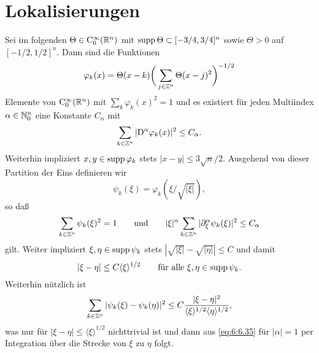 \section{Lokalisierungen}
Sei im folgenden $\Theta\in\mathrm C_0^\infty(\mathbb R^n)$ mit $\operatorname{supp}\Theta\subset [-3/4,3/4]^n$ sowie $\Theta>0$ auf $[-1/2,1/2]^n$. Dann sind die Funktionen
\begin{equation}
\varphi_k(x) = \Theta(x-k) \bigg(\sum_{j\in\mathbb Z^n} \Theta(x-j)^2\bigg)^{-1/2}
\end{equation}
Elemente von $\mathrm C_0^\infty(\mathbb R^n)$ mit $\sum_{k} \varphi_k(x)^2=1$ und es existiert für jeden Multiindex $\alpha\in\mathbb N_0^n$ eine Konstante $C_\alpha$ mit
\begin{equation}
    \sum_{k\in\mathbb Z^n} | \mathrm D^\alpha \varphi_k(x)|^2 \le C_\alpha.
\end{equation}
Weiterhin impliziert $x,y\in\operatorname{supp}\varphi_k$ stets $|x-y|\le 3\sqrt n/2$. Ausgehend von dieser Partition der Eins definieren wir
\begin{equation}
    \psi_k(\xi)= \varphi_k(\xi / \sqrt{|\xi|}), 
\end{equation}
so daß
\begin{equation}\label{eq:6:6.35} 
    \sum_{k\in\mathbb Z^n} \psi_k(\xi)^2 = 1\qquad\text{und}\qquad |\xi|^\alpha \sum_{k\in\mathbb Z^n} |\partial_\xi^\alpha \psi_k(\xi)|^2 \le C_\alpha
\end{equation}
gilt. Weiter impliziert $\xi,\eta\in\operatorname{supp}\psi_k$ stets $|\sqrt{|\xi|}-\sqrt{|\eta|}|\le C$ und damit 
\begin{equation}
 |\xi-\eta|\le C \langle\xi\rangle^{1/2} \qquad\text{für alle $\xi,\eta\in\operatorname{supp}\psi_k$}.
\end{equation}
Weiterhin nützlich ist
\begin{equation}
  \sum_{k\in\mathbb Z^n} |\psi_k(\xi)-\psi_k(\eta)|^2 \le C \frac{|\xi-\eta|^2}{ \langle\xi\rangle^{1/2} \langle\eta\rangle^{1/2}},
\end{equation} 
was nur für $|\xi-\eta|\le \langle\xi\rangle^{1/2}$ nichttrivial ist und dann aus \eqref{eq:6:6.35} für $|\alpha|=1$ per Integration über die Strecke von $\xi$ zu $\eta$ folgt.

